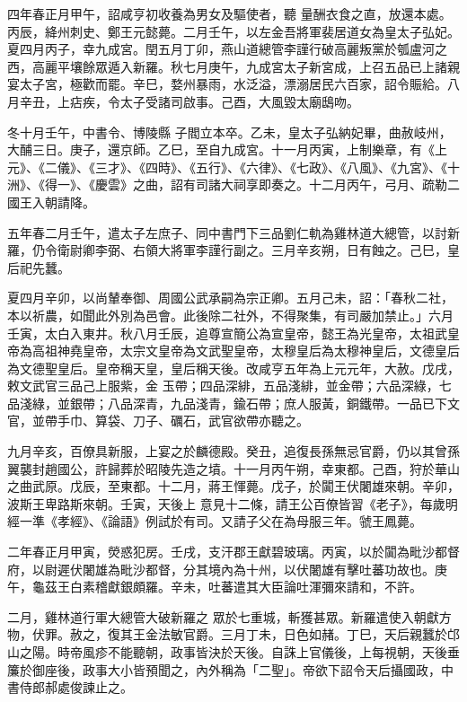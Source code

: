 \begin{pinyinscope}
 四年春正月甲午，詔咸亨初收養為男女及驅使者，聽
 量酬衣食之直，放還本處。丙辰，絳州刺史、鄭王元懿薨。二月壬午，以左金吾將軍裴居道女為皇太子弘妃。夏四月丙子，幸九成宮。閏五月丁卯，燕山道總管李謹行破高麗叛黨於瓠盧河之西，高麗平壤餘眾遁入新羅。秋七月庚午，九成宮太子新宮成，上召五品已上諸親宴太子宮，極歡而罷。辛巳，婺州暴雨，水泛溢，漂溺居民六百家，詔令賑給。八月辛丑，上痁疾，令太子受諸司啟事。己酉，大風毀太廟鴟吻。



 冬十月壬午，中書令、博陵縣
 子閻立本卒。乙未，皇太子弘納妃畢，曲赦岐州，大酺三日。庚子，還京師。乙巳，至自九成宮。十一月丙寅，上制樂章，有《上元》、《二儀》、《三才》、《四時》、《五行》、《六律》、《七政》、《八風》、《九宮》、《十洲》、《得一》、《慶雲》之曲，詔有司諸大祠享即奏之。十二月丙午，弓月、疏勒二國王入朝請降。



 五年春二月壬午，遣太子左庶子、同中書門下三品劉仁軌為雞林道大總管，以討新羅，仍令衛尉卿李弼、右領大將軍李謹行副之。三月辛亥朔，日有蝕之。己巳，皇
 后祀先蠶。



 夏四月辛卯，以尚輦奉御、周國公武承嗣為宗正卿。五月己未，詔：「春秋二社，本以祈農，如聞此外別為邑會。此後除二社外，不得聚集，有司嚴加禁止。」六月壬寅，太白入東井。秋八月壬辰，追尊宣簡公為宣皇帝，懿王為光皇帝，太祖武皇帝為高祖神堯皇帝，太宗文皇帝為文武聖皇帝，太穆皇后為太穆神皇后，文德皇后為文德聖皇后。皇帝稱天皇，皇后稱天後。改咸亨五年為上元元年，大赦。戊戌，敕文武官三品己上服紫，金
 玉帶；四品深緋，五品淺緋，並金帶；六品深綠，七品淺綠，並銀帶；八品深青，九品淺青，鍮石帶；庶人服黃，銅鐵帶。一品已下文官，並帶手巾、算袋、刀子、礪石，武官欲帶亦聽之。



 九月辛亥，百僚具新服，上宴之於麟德殿。癸丑，追復長孫無忌官爵，仍以其曾孫翼襲封趙國公，許歸葬於昭陵先造之墳。十一月丙午朔，幸東都。己酉，狩於華山之曲武原。戊辰，至東都。十二月，蔣王惲薨。戊子，於闐王伏闍雄來朝。辛卯，波斯王卑路斯來朝。壬寅，天後上
 意見十二條，請王公百僚皆習《老子》，每歲明經一準《孝經》、《論語》例試於有司。又請子父在為母服三年。虢王鳳薨。



 二年春正月甲寅，熒惑犯房。壬戌，支汗郡王獻碧玻璃。丙寅，以於闐為毗沙都督府，以尉遲伏闍雄為毗沙都督，分其境內為十州，以伏闍雄有擊吐蕃功故也。庚午，龜茲王白素稽獻銀頗羅。辛未，吐蕃遣其大臣論吐渾彌來請和，不許。



 二月，雞林道行軍大總管大破新羅之
 眾於七重城，斬獲甚眾。新羅遣使入朝獻方物，伏罪。赦之，復其王金法敏官爵。三月丁未，日色如赭。丁巳，天后親蠶於邙山之陽。時帝風疹不能聽朝，政事皆決於天後。自誅上官儀後，上每視朝，天後垂簾於御座後，政事大小皆預聞之，內外稱為「二聖」。帝欲下詔令天后攝國政，中書侍郎郝處俊諫止之。




\end{pinyinscope}
